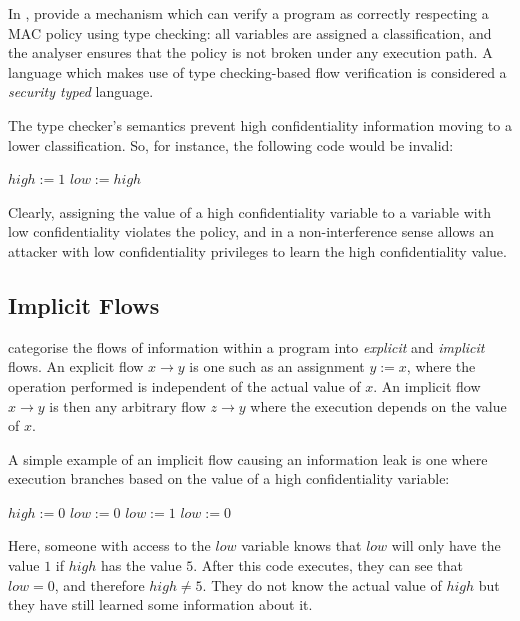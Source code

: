 In , \citeauthor{denning1977certification} \cite{denning1977certification} provide a mechanism which can verify a program as correctly respecting a MAC policy using type checking: all variables are assigned a classification, and the analyser ensures that the policy is not broken under any execution path. A language which makes use of type checking-based flow verification is considered a \textit{security typed} language.

The type checker's semantics prevent high confidentiality information moving to a lower classification. So, for instance, the following code would be invalid:

\begin{algorithmic}
\State $ high := 1 $
\State $ low := high $
\end{algorithmic}

Clearly, assigning the value of a high confidentiality variable to a variable with low confidentiality violates the policy, and in a non-interference sense allows an attacker with low confidentiality privileges to learn the high confidentiality value.

\subsection{Implicit Flows}

\citeauthor{denning1977certification} \cite{denning1977certification} categorise the flows of information within a program into \textit{explicit} and \textit{implicit} flows. An explicit flow $ x \rightarrow y $ is one such as an assignment $ y := x $, where the operation performed is independent of the actual value of $ x $. An implicit flow $ x \rightarrow y $ is then any arbitrary flow $ z \rightarrow y $ where the execution depends on the value of $ x $. 

A simple example of an implicit flow causing an information leak is one where execution branches based on the value of a high confidentiality variable:

\begin{algorithmic}
	\State $ high := 0 $
	\State $ low := 0 $
		\State $ low := 1 $
	\Else
		\State $ low := 0 $
	\EndIf
\end{algorithmic}

Here, someone with access to the $ low $ variable knows that $ low $ will only have the value $ 1 $ if $ high $ has the value $ 5 $. After this code executes, they can see that $ low = 0 $, and therefore $ high \ne 5 $. They do not know the actual value of $ high $ but they have still learned some information about it.

